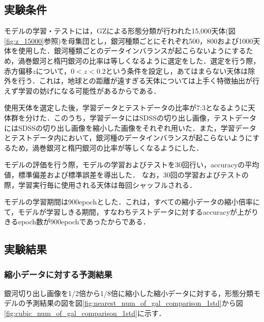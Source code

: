 \documentclass[a4j, 11pt]{jreport}
\begin{document}
\subsection{実験条件}
モデルの学習・テストには，GZによる形態分類が行われた15,000天体(図\ref{fig:z_15000}参照)を母集団とし，銀河種類ごとにそれぞれ500，800および1000天体を使用した．銀河種類ごとのデータインバランスが起こらないようにするため，渦巻銀河と楕円銀河の比率は等しくなるように選定をした．選定を行う際，赤方偏移$z$について，$0 < z < 0.2$という条件を設定し，あてはまらない天体は除外を行う．これは，地球との距離が遠すぎる天体については上手く特徴抽出が行えず学習の妨げになる可能性があるからである．

使用天体を選定した後，学習データとテストデータの比率が7:3となるように天体群を分けた．このうち，学習データにはSDSSの切り出し画像，テストデータにはSDSSの切り出し画像を縮小した画像をそれぞれ用いた．また，学習データとテストデータ内において，銀河種のデータインバランスが起こらないようにするため，渦巻銀河と楕円銀河の比率が等しくなるようにした．

モデルの評価を行う際，モデルの学習およびテストを30回行い，accuracyの平均値，標準偏差および標準誤差を導出した．
なお，30回の学習およびテストの際，学習実行毎に使用される天体は毎回シャッフルされる．

モデルの学習期間は900epochとした．これは，すべての縮小データの縮小倍率にて，モデルが学習しきる期間，すなわちテストデータに対するaccuracyが上がりきるepoch数が900epochであったからである．

\subsection{実験結果}
\subsubsection{縮小データに対する予測結果}
銀河切り出し画像を1/2倍から1/8倍に縮小した縮小データに対する，形態分類モデルの予測結果の図を図\ref{fig:nearest_num_of_gal_comparison_1std}から図\ref{fig:cubic_num_of_gal_comparison_1std}に示す．
\end{document}

